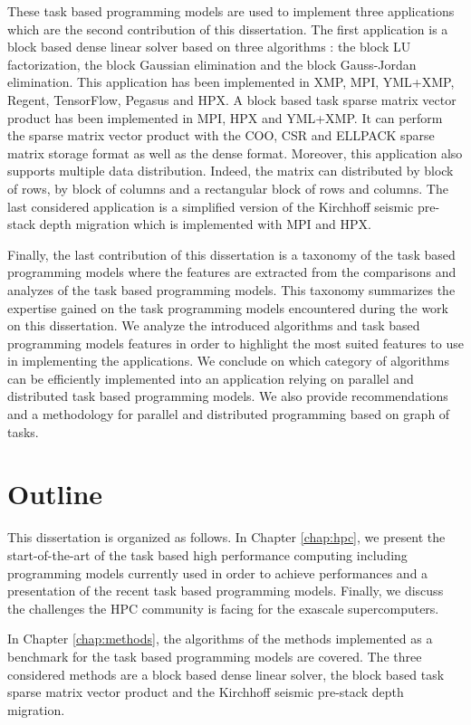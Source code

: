 These task based programming models are used to implement three applications which are the second contribution of this dissertation.
The first application is a block based dense linear solver based on three algorithms : the block LU factorization, the block Gaussian elimination and the block Gauss-Jordan elimination.
This application has been implemented in XMP, MPI, YML+XMP, Regent, TensorFlow, Pegasus and HPX.
A block based task sparse matrix vector product has been implemented in MPI, HPX and YML+XMP.
It can perform the sparse matrix vector product with the COO, CSR and ELLPACK sparse matrix storage format as well as the dense format.
Moreover, this application also supports multiple data distribution.
Indeed, the matrix can distributed by block of rows, by block of columns and a rectangular block of rows and columns.
The last considered application is a simplified version of the Kirchhoff seismic pre-stack depth migration which is implemented with MPI and HPX.

Finally, the last contribution of this dissertation is a taxonomy of the task based programming models where the features are extracted from the comparisons and analyzes of the task based programming models.
This taxonomy summarizes the expertise gained on the task programming models encountered during the work on this dissertation.
We analyze the introduced algorithms and task based programming models features in order to highlight the most suited features to use in implementing the applications.
We conclude on which category of algorithms can be efficiently implemented into an application relying on parallel and distributed task based programming models.
We also provide recommendations and a methodology for parallel and distributed programming based on graph of tasks.

\section{Outline}
This dissertation is organized as follows. In Chapter \ref{chap:hpc}, we present the start-of-the-art of the task based high performance computing including programming models currently used in order to achieve performances and a presentation of the recent task based programming models.
Finally, we discuss the challenges the HPC community is facing for the exascale supercomputers.

In Chapter \ref{chap:methods}, the algorithms of the methods implemented as a benchmark for the task based programming models are covered.
The three considered methods are a block based dense linear solver, the block based task sparse matrix vector product and the Kirchhoff seismic pre-stack depth migration.

